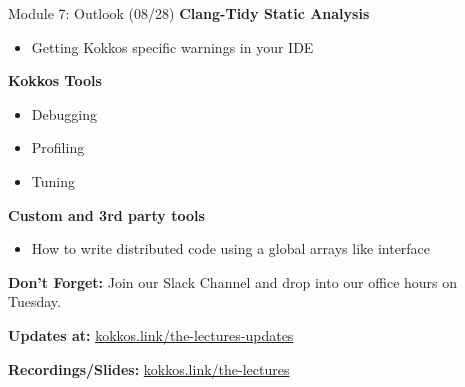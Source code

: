 \begin{frame}{Module 7: Outlook (08/28)}
    \vspace{-3pt}
	\textbf{Clang-Tidy Static Analysis}
	\begin{itemize}
        \item {Getting Kokkos specific warnings in your IDE}
	\end{itemize}
	
	\vspace{5pt}
	\textbf{Kokkos Tools}
	\begin{itemize}
		\item {Debugging}
		\item {Profiling}
                \item {Tuning}
	\end{itemize}

	\vspace{5pt}
	\textbf{Custom and 3rd party tools}
	\begin{itemize}
		\item {How to write distributed code using a global arrays like interface}
	\end{itemize}

	\vspace{5pt}
	\textbf{Don't Forget:} Join our Slack Channel and drop into our office hours on Tuesday.
	
	\vspace{5pt}
	\textbf{Updates at:} \href{https://kokkos.link/the-lectures-updates}{kokkos.link/the-lectures-updates}
	
	\vspace{5pt}
	\textbf{Recordings/Slides:} \href{https://kokkos.link/the-lectures}{kokkos.link/the-lectures}

\end{frame}



